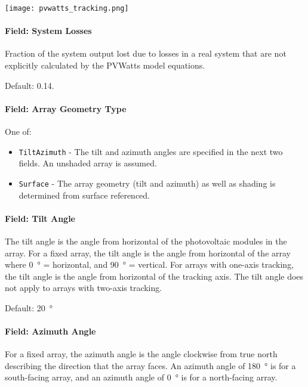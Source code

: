 \texttt{[image: pvwatts\_tracking.png]}

\paragraph{Field: System Losses}\label{field-system-losses}

Fraction of the system output lost due to losses in a real system that
are not explicitly calculated by the PVWatts model equations.

Default: 0.14.

\paragraph{Field: Array Geometry
Type}\label{field-array-geometry-type}

One of:

\begin{itemize}
\tightlist
\item
  \texttt{TiltAzimuth} - The tilt and azimuth angles are specified in
  the next two fields. An unshaded array is assumed.
\item
  \texttt{Surface} - The array geometry (tilt and azimuth) as well as
  shading is determined from surface referenced.
\end{itemize}

\paragraph{Field: Tilt Angle}\label{field-tilt-angle}

The tilt angle is the angle from horizontal of the photovoltaic modules
in the array. For a fixed array, the tilt angle is the angle from
horizontal of the array where \SI{0}{\degree} = horizontal, and \SI{90}{\degree} = vertical. For
arrays with one-axis tracking, the tilt angle is the angle from
horizontal of the tracking axis. The tilt angle does not apply to arrays
with two-axis tracking.

Default: \SI{20}{\degree}

\paragraph{Field: Azimuth Angle}\label{field-azimuth-angle}

For a fixed array, the azimuth angle is the angle clockwise from true
north describing the direction that the array faces. An azimuth angle of
\SI{180}{\degree} is for a south-facing array, and an azimuth angle of \SI{0}{\degree}
is for a north-facing array.

